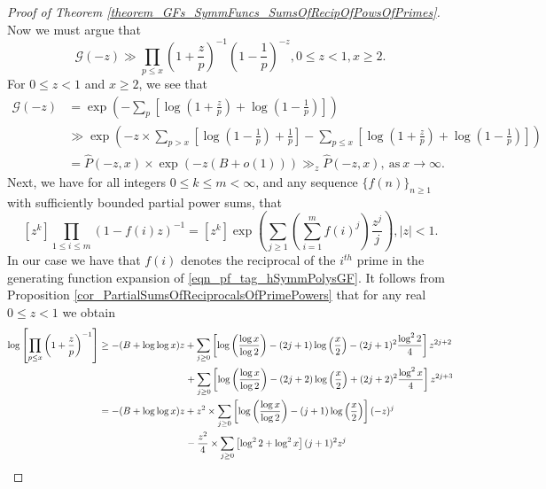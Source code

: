 \documentclass[11pt,reqno,a4letter]{article}
\numberwithin{figure}{section}
\numberwithin{table}{section}
\theoremstyle{plain}
\numberwithin{theorem}{section}
\theoremstyle{definition}
\begin{document}
\begin{proof}[Proof of Theorem \ref{theorem_GFs_SymmFuncs_SumsOfRecipOfPowsOfPrimes}]
Now we must argue that 
\[
\mathcal{G}(-z) \gg \prod_{p \leq x} \left(1 + \frac{z}{p}\right)^{-1} 
     \left(1 - \frac{1}{p}\right)^{-z}, 0 \leq z < 1, x \geq 2. 
\]
For $0 \leq z < 1$ and $x \geq 2$, we see that 
\begin{align*} 
\mathcal{G}(-z) & = \exp\left(-\sum_p \left[\log\left(1 + \frac{z}{p}\right) + 
     \log\left(1 - \frac{1}{p}\right)\right]\right) \\ 
     & \gg 
     \exp\left(-z \times \sum_{p > x} \left[
     \log\left(1 - \frac{1}{p}\right) + \frac{1}{p}\right] - 
     \sum_{p \leq x} \left[\log\left(1 + \frac{z}{p}\right) + 
     \log\left(1 - \frac{1}{p}\right)\right]\right) \\ 
     & = \widehat{P}(-z, x) \times \exp\left(-z(B+o(1))\right) 
     \gg_z \widehat{P}(-z, x), \mathrm{\ as\ } x \rightarrow \infty. 
\end{align*} 
Next, we have for all integers $0 \leq k \leq m < \infty$, and any sequence 
$\{f(n)\}_{n \geq 1}$ with sufficiently bounded partial power sums, that 
\cite[\S 2]{MACDONALD-SYMFUNCS} 
\begin{equation} 
\label{eqn_pf_tag_hSymmPolysGF} 
[z^k] \prod_{1 \leq i \leq m} (1-f(i) z)^{-1} = [z^k] \exp\left(\sum_{j \geq 1} 
     \left(\sum_{i=1}^m f(i)^j\right) \frac{z^j}{j}\right), |z| < 1. 
\end{equation} 
In our case we have that $f(i)$ denotes the reciprocal of the 
$i^{th}$ prime in the generating function expansion of 
\eqref{eqn_pf_tag_hSymmPolysGF}. 
It follows from Proposition \ref{cor_PartialSumsOfReciprocalsOfPrimePowers} that 
for any real $0 \leq z < 1$ we obtain 
\begin{align} 
\notag 
\log\left[\prod_{p \leq x} \left(1+\frac{z}{p}\right)^{-1}\right] & \geq -(B + \log\log x) z + 
     \sum_{j \geq 0} \left[\log\left(\frac{\log x}{\log 2}\right) - 
     (2j+1) \log\left(\frac{x}{2}\right) - (2j+1)^2 \frac{\log^2 2}{4}\right] z^{2j+2} \\ 
\notag 
     & \phantom{\geq -(B + \log\log x) z\ } + 
     \sum_{j \geq 0} \left[\log\left(\frac{\log x}{\log 2}\right) - 
     (2j+2) \log\left(\frac{x}{2}\right) + (2j+2)^2 \frac{\log^2 x}{4}\right] z^{2j+3} \\ 
\notag 
     & = -(B + \log\log x) z + z^2 \times \sum_{j \geq 0} \left[ 
     \log\left(\frac{\log x}{\log 2}\right) - 
     (j+1) \log\left(\frac{x}{2}\right)\right] (-z)^j \\ 
\notag 
     & \phantom{= -(B + \log\log x) z\ } - 
     \frac{z^2}{4} \times \sum_{j \geq 0} \left[\log^2 2 + \log^2 x\right] (j+1)^2 z^j \\ 

\end{align}
\end{proof}
\end{document}
